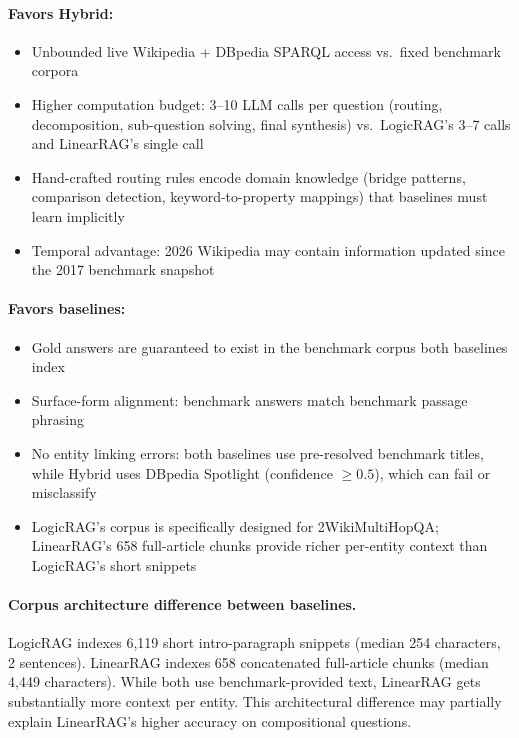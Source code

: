 \paragraph{Favors Hybrid:}
\begin{itemize}
\item Unbounded live Wikipedia + DBpedia SPARQL access vs.\ fixed benchmark corpora
\item Higher computation budget: 3--10 LLM calls per question (routing, decomposition, sub-question solving, final synthesis) vs.\ LogicRAG's 3--7 calls and LinearRAG's single call
\item Hand-crafted routing rules encode domain knowledge (bridge patterns, comparison detection, keyword-to-property mappings) that baselines must learn implicitly
\item Temporal advantage: 2026 Wikipedia may contain information updated since the 2017 benchmark snapshot
\end{itemize}

\paragraph{Favors baselines:}
\begin{itemize}
\item Gold answers are guaranteed to exist in the benchmark corpus both baselines index
\item Surface-form alignment: benchmark answers match benchmark passage phrasing
\item No entity linking errors: both baselines use pre-resolved benchmark titles, while Hybrid uses DBpedia Spotlight (confidence $\geq 0.5$), which can fail or misclassify
\item LogicRAG's corpus is specifically designed for 2WikiMultiHopQA; LinearRAG's 658 full-article chunks provide richer per-entity context than LogicRAG's short snippets
\end{itemize}

\paragraph{Corpus architecture difference between baselines.}
LogicRAG indexes 6{,}119 short intro-paragraph snippets (median 254 characters, 2 sentences). LinearRAG indexes 658 concatenated full-article chunks (median 4{,}449 characters). While both use benchmark-provided text, LinearRAG gets substantially more context per entity. This architectural difference may partially explain LinearRAG's higher accuracy on compositional questions.

